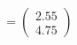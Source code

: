 \documentclass[preview]{standalone}
\begin{document}
\begin{align*}
= \begin{pmatrix} 2.55 \\ 4.75 \end{pmatrix}
\end{align*}
\end{document}
